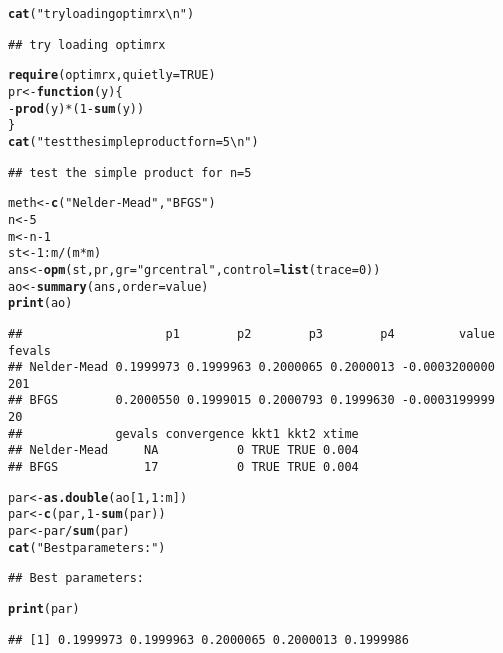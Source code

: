 \documentclass[11pt]{article}\usepackage[]{graphicx}\usepackage[]{color}
\makeatletter
\newcommand{\hlnum}[1]{\textcolor[rgb]{0.686,0.059,0.569}{#1}}%
\newcommand{\hlstr}[1]{\textcolor[rgb]{0.192,0.494,0.8}{#1}}%
\newcommand{\hlopt}[1]{\textcolor[rgb]{0,0,0}{#1}}%
\newcommand{\hlstd}[1]{\textcolor[rgb]{0.345,0.345,0.345}{#1}}%
\newcommand{\hlkwa}[1]{\textcolor[rgb]{0.161,0.373,0.58}{\textbf{#1}}}%
\newcommand{\hlkwb}[1]{\textcolor[rgb]{0.69,0.353,0.396}{#1}}%
\newcommand{\hlkwc}[1]{\textcolor[rgb]{0.333,0.667,0.333}{#1}}%
\newcommand{\hlkwd}[1]{\textcolor[rgb]{0.737,0.353,0.396}{\textbf{#1}}}%
\newenvironment{kframe}{%
 \def\at@end@of@kframe{}%
 \ifinner\ifhmode%
  \def\at@end@of@kframe{\end{minipage}}%
  \begin{minipage}{\columnwidth}%
 \fi\fi%
 \def\FrameCommand##1{\hskip\@totalleftmargin \hskip-\fboxsep
 \colorbox{shadecolor}{##1}\hskip-\fboxsep
     \hskip-\linewidth \hskip-\@totalleftmargin \hskip\columnwidth}%
 \MakeFramed {\advance\hsize-\width
   \@totalleftmargin\z@ \linewidth\hsize
   \@setminipage}}%
 {\par\unskip\endMakeFramed%
 \at@end@of@kframe}
\newenvironment{knitrout}{}{} %
\makeatother
\begin{document}
\begin{knitrout}\scriptsize
{}\color{fgcolor}\begin{kframe}
\begin{alltt}
\hlkwd{cat}\hlstd{(}\hlstr{"try loading optimrx\textbackslash{}n"}\hlstd{)}
\end{alltt}
\begin{verbatim}
## try loading optimrx
\end{verbatim}
\begin{alltt}
\hlkwd{require}\hlstd{(optimrx,} \hlkwc{quietly}\hlstd{=}\hlnum{TRUE}\hlstd{)}
\hlstd{pr} \hlkwb{<-} \hlkwa{function}\hlstd{(}\hlkwc{y}\hlstd{) \{}
\hlopt{-} \hlkwd{prod}\hlstd{(y)}\hlopt{*}\hlstd{(}\hlnum{1}\hlopt{-}\hlkwd{sum}\hlstd{(y))}
\hlstd{\}}
\hlkwd{cat}\hlstd{(}\hlstr{"test the simple product for n=5\textbackslash{}n"}\hlstd{)}
\end{alltt}
\begin{verbatim}
## test the simple product for n=5
\end{verbatim}
\begin{alltt}
\hlstd{meth} \hlkwb{<-} \hlkwd{c}\hlstd{(}\hlstr{"Nelder-Mead"}\hlstd{,} \hlstr{"BFGS"}\hlstd{)}
\hlstd{n}\hlkwb{<-}\hlnum{5}
\hlstd{m}\hlkwb{<-}\hlstd{n}\hlopt{-}\hlnum{1}
  \hlstd{st}\hlkwb{<-}\hlnum{1}\hlopt{:}\hlstd{m}\hlopt{/}\hlstd{(m}\hlopt{*}\hlstd{m)}
   \hlstd{ans}\hlkwb{<-}\hlkwd{opm}\hlstd{(st, pr,} \hlkwc{gr}\hlstd{=}\hlstr{"grcentral"}\hlstd{,} \hlkwc{control}\hlstd{=}\hlkwd{list}\hlstd{(}\hlkwc{trace}\hlstd{=}\hlnum{0}\hlstd{))}
   \hlstd{ao}\hlkwb{<-}\hlkwd{summary}\hlstd{(ans,}\hlkwc{order}\hlstd{=value)}
\hlkwd{print}\hlstd{(ao)}
\end{alltt}
\begin{verbatim}
##                    p1        p2        p3        p4         value fevals
## Nelder-Mead 0.1999973 0.1999963 0.2000065 0.2000013 -0.0003200000    201
## BFGS        0.2000550 0.1999015 0.2000793 0.1999630 -0.0003199999     20
##             gevals convergence kkt1 kkt2 xtime
## Nelder-Mead     NA           0 TRUE TRUE 0.004
## BFGS            17           0 TRUE TRUE 0.004
\end{verbatim}
\begin{alltt}
\hlstd{par} \hlkwb{<-} \hlkwd{as.double}\hlstd{(ao[}\hlnum{1}\hlstd{,}\hlnum{1}\hlopt{:}\hlstd{m])}
\hlstd{par} \hlkwb{<-} \hlkwd{c}\hlstd{(par,} \hlnum{1}\hlopt{-}\hlkwd{sum}\hlstd{(par))}
\hlstd{par} \hlkwb{<-} \hlstd{par}\hlopt{/}\hlkwd{sum}\hlstd{(par)}
\hlkwd{cat}\hlstd{(}\hlstr{"Best parameters:"}\hlstd{)}
\end{alltt}
\begin{verbatim}
## Best parameters:
\end{verbatim}
\begin{alltt}
\hlkwd{print}\hlstd{(par)}
\end{alltt}
\begin{verbatim}
## [1] 0.1999973 0.1999963 0.2000065 0.2000013 0.1999986
\end{verbatim}
\end{kframe}
\end{knitrout}
\end{document}
